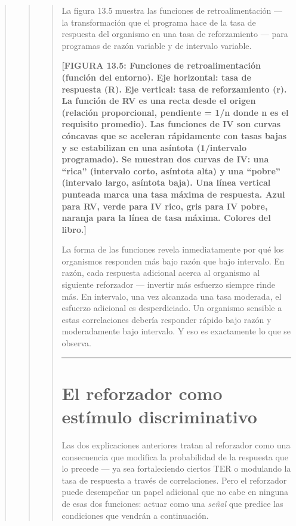\documentclass[
  letterpaper,
  DIV=11,
  numbers=noendperiod]{scrreprt}
\begin{document}
\begin{tcolorbox}[enhanced jigsaw, arc=.35mm, bottomrule=.15mm, breakable, colback=white, colframe=quarto-callout-note-color-frame, left=2mm, leftrule=.75mm, opacityback=0, rightrule=.15mm, toprule=.15mm]
\begin{quote}
\begin{quote}
\begin{quote}
La figura 13.5 muestra las funciones de retroalimentación --- la
transformación que el programa hace de la tasa de respuesta del
organismo en una tasa de reforzamiento --- para programas de razón
variable y de intervalo variable.

\textbf{{[}FIGURA 13.5: Funciones de retroalimentación (función del
entorno). Eje horizontal: tasa de respuesta (R). Eje vertical: tasa de
reforzamiento (r). La función de RV es una recta desde el origen
(relación proporcional, pendiente = 1/n donde n es el requisito
promedio). Las funciones de IV son curvas cóncavas que se aceleran
rápidamente con tasas bajas y se estabilizan en una asíntota
(1/intervalo programado). Se muestran dos curvas de IV: una ``rica''
(intervalo corto, asíntota alta) y una ``pobre'' (intervalo largo,
asíntota baja). Una línea vertical punteada marca una tasa máxima de
respuesta. Azul para RV, verde para IV rico, gris para IV pobre, naranja
para la línea de tasa máxima. Colores del libro.{]}}

La forma de las funciones revela inmediatamente por qué los organismos
responden más bajo razón que bajo intervalo. En razón, cada respuesta
adicional acerca al organismo al siguiente reforzador --- invertir más
esfuerzo siempre rinde más. En intervalo, una vez alcanzada una tasa
moderada, el esfuerzo adicional es desperdiciado. Un organismo sensible
a estas correlaciones debería responder rápido bajo razón y
moderadamente bajo intervalo. Y eso es exactamente lo que se observa.

\begin{center}\rule{0.5\linewidth}{0.5pt}\end{center}

\mbox{}%
\section{El reforzador como estímulo
discriminativo}\label{el-reforzador-como-estuxedmulo-discriminativo}

Las dos explicaciones anteriores tratan al reforzador como una
consecuencia que modifica la probabilidad de la respuesta que lo precede
--- ya sea fortaleciendo ciertos TER o modulando la tasa de respuesta a
través de correlaciones. Pero el reforzador puede desempeñar un papel
adicional que no cabe en ninguna de esas dos funciones: actuar como una
\emph{señal} que predice las condiciones que vendrán a continuación.


\end{quote}
\end{quote}
\end{quote}
\end{tcolorbox}
\end{document}
